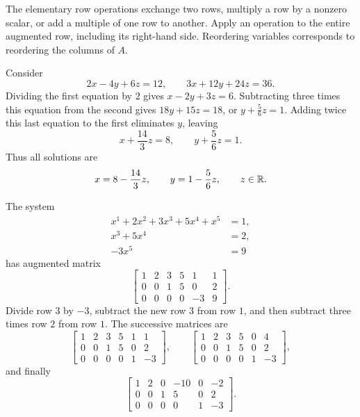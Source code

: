 The elementary row operations exchange two rows, multiply a row by a
nonzero scalar, or add a multiple of one row to another. Apply an operation
to the entire augmented row, including its right-hand side. Reordering
variables corresponds to reordering the columns of \(A\).

\begin{example}
  Consider
  \[
    2x-4y+6z=12,\qquad 3x+12y+24z=36.
  \]
  Dividing the first equation by \(2\) gives \(x-2y+3z=6\).
  Subtracting three times this equation from the second gives
  \(18y+15z=18\), or \(y+\frac56z=1\). Adding twice this last equation
  to the first eliminates \(y\), leaving
  \[
    x+\frac{14}{3}z=8,\qquad y+\frac56z=1.
  \]
  Thus all solutions are
  \[
    x=8-\frac{14}{3}z,\qquad y=1-\frac56z,\qquad z\in\mathbb{R}.
  \]
\end{example}

\begin{example}
  The system
  \[
    \begin{aligned}
      x^1+2x^2+3x^3+5x^4+x^5&=1,\\
      x^3+5x^4&=2,\\
      -3x^5&=9
    \end{aligned}
  \]
  has augmented matrix
  \[
    \left[\begin{array}{rrrrr|r}
      1&2&3&5&1&1\\
      0&0&1&5&0&2\\
      0&0&0&0&-3&9
    \end{array}\right].
  \]
  Divide row \(3\) by \(-3\), subtract the new row \(3\) from row \(1\),
  and then subtract three times row \(2\) from row \(1\). The successive
  matrices are
  \[
    \left[\begin{array}{rrrrr|r}
      1&2&3&5&1&1\\0&0&1&5&0&2\\0&0&0&0&1&-3
    \end{array}\right],
    \qquad
    \left[\begin{array}{rrrrr|r}
      1&2&3&5&0&4\\0&0&1&5&0&2\\0&0&0&0&1&-3
    \end{array}\right],
  \]
  and finally
  \[
    \left[\begin{array}{rrrrr|r}
      1&2&0&-10&0&-2\\0&0&1&5&0&2\\0&0&0&0&1&-3
    \end{array}\right].
  \]
\end{example}

